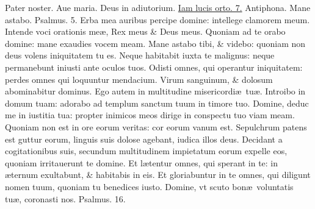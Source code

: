 \documentclass[a5paper,10pt]{book}
\def\ae{æ}
\begin{document}
\begin{multicols*}{2}
\par \noindent \color{red} P\color{black}ater noster. Aue maria. Deus in adiutorium. \hyperlink{Iamlucis}{Iam lucis orto. 7.} \color{red} Antiphona. \color{black} Mane astabo. \color{red} Psalmus. \hypertarget{ps5}{5.} \color{black}
\vspace{-.5em}
Erba mea auribus percipe domine: intellege clamorem meum.
\newline \color{red} I\color{black}ntende voci orationis me\ae , Rex meus \& Deus meus.
\newline \color{red} Q\color{black}uoniam ad te orabo domine: mane exaudies vocem meam.
\newline \color{red} M\color{black}ane astabo tibi, \& videbo: quoniam non deus volens iniquitatem tu es.
\newline \color{red} N\color{black}eque habitabit iuxta te malignus: neque permanebunt iniusti ante oculos tuos.
\newline \color{red} O\color{black}disti omnes, qui operantur iniquitatem: perdes omnes qui loquuntur mendacium.
\newline \color{red} V\color{black}irum sanguinum, \& dolosum abominabitur dominus.
\newline \color{red} E\color{black}go autem in multitudine misericordi\ae \ tu\ae .
\newline \color{red} I\color{black}ntroibo in domum tuam: adorabo ad templum sanctum tuum in timore tuo.
\newline \color{red} D\color{black}omine, deduc me in iustitia tua: propter inimicos meos dirige in conspectu tuo viam meam.
\newline \color{red} Q\color{black}uoniam non est in ore eorum veritas: cor eorum vanum est.
\newline \color{red} S\color{black}epulchrum patens est guttur eorum, linguis suis dolose agebant, iudica illos deus.
\newline \color{red} D\color{black}ecidant a cogitationibus suis, secundum multitudinem impietatum eorum expelle eos, quoniam irritauerunt te domine.
\newline \color{red} E\color{black}t l\ae tentur omnes, qui sperant in te: in \ae ternum exultabunt, \& habitabis in eis.
\newline \color{red} E\color{black}t gloriabuntur in te omnes, qui diligunt nomen tuum, quoniam tu benedices iusto.
\newline \color{red} D\color{black}omine, vt scuto bon\ae \ voluntatis tu\ae , coronasti nos. \quad \color{red} Psalmus. \hypertarget{ps16}{16.} \color{black}

\end{multicols*}
\end{document}
